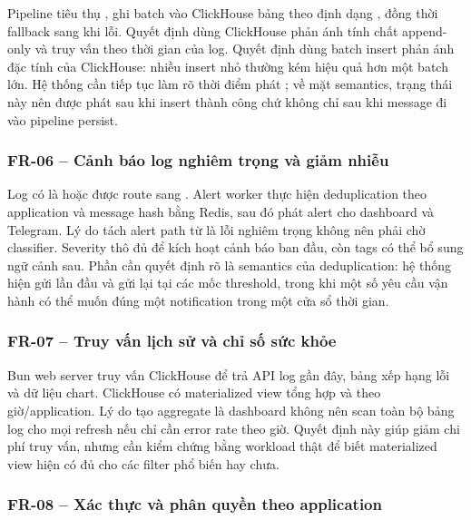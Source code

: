 Pipeline  tiêu thụ , ghi batch vào ClickHouse bảng  theo định dạng , đồng thời fallback sang  khi lỗi. Quyết định dùng ClickHouse phản ánh tính chất append-only và truy vấn theo thời gian của log. Quyết định dùng batch insert phản ánh đặc tính của ClickHouse: nhiều insert nhỏ thường kém hiệu quả hơn một batch lớn. Hệ thống cần tiếp tục làm rõ thời điểm phát ; về mặt semantics, trạng thái này nên được phát sau khi insert thành công chứ không chỉ sau khi message đi vào pipeline persist.

\subsubsection{FR-06 -- Cảnh báo log nghiêm trọng và giảm nhiễu}

Log có  là  hoặc  được route sang . Alert worker thực hiện deduplication theo application và message hash bằng Redis, sau đó phát alert cho dashboard và Telegram. Lý do tách alert path từ  là lỗi nghiêm trọng không nên phải chờ classifier. Severity thô đủ để kích hoạt cảnh báo ban đầu, còn tags có thể bổ sung ngữ cảnh sau. Phần cần quyết định rõ là semantics của deduplication: hệ thống hiện gửi lần đầu và gửi lại tại các mốc threshold, trong khi một số yêu cầu vận hành có thể muốn đúng một notification trong một cửa sổ thời gian.

\subsubsection{FR-07 -- Truy vấn lịch sử và chỉ số sức khỏe}

Bun web server truy vấn ClickHouse để trả API log gần đây, bảng xếp hạng lỗi và dữ liệu chart. ClickHouse có materialized view tổng hợp  và  theo giờ/application. Lý do tạo aggregate là dashboard không nên scan toàn bộ bảng log cho mọi refresh nếu chỉ cần error rate theo giờ. Quyết định này giúp giảm chi phí truy vấn, nhưng cần kiểm chứng bằng workload thật để biết materialized view hiện có đủ cho các filter phổ biến hay chưa.

\subsubsection{FR-08 -- Xác thực và phân quyền theo application}

